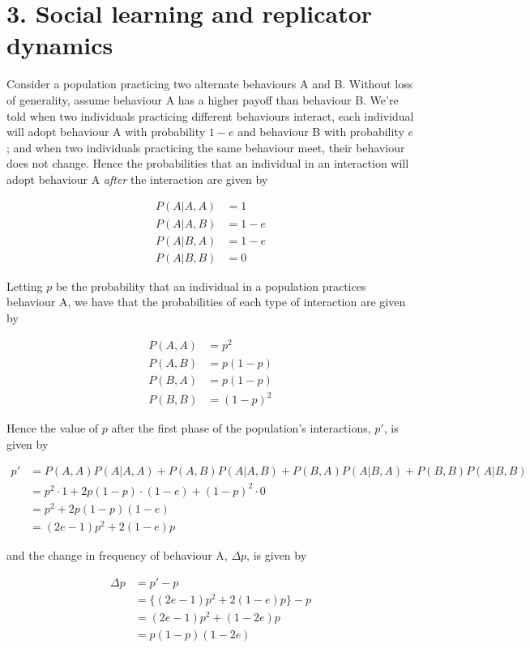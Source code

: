 \documentclass{article}
\begin{document}
\section*{3. Social learning and replicator dynamics}

Consider a population practicing two alternate behaviours A and B.
Without loss of generality, assume behaviour A has a higher payoff than
behaviour B. We're told when two individuals practicing different
behaviours interact, each individual will adopt behaviour A with
probability $1 - e$ and behaviour B with probability $e$; and when two
individuals practicing the same behaviour meet, their behaviour does not
change. Hence the probabilities that an individual in an interaction
will adopt behaviour A \textit{after} the interaction are given by

\begin{align*}
    P(A|A,A) &= 1 \\
    P(A|A,B) &= 1 - e \\
    P(A|B,A) &= 1 - e \\
    P(A|B,B) &= 0
\end{align*}

Letting $p$ be the probability that an individual in a population
practices behaviour A, we have that the probabilities of each type of
interaction are given by

\begin{align*}
    P(A,A) &= p^2 \\
    P(A,B) &= p(1 - p) \\
    P(B,A) &= p(1 - p) \\
    P(B,B) &= (1 - p)^2
\end{align*}

Hence the value of $p$ after the first phase of the population's
interactions, $p'$, is given by

\begin{align*}
    p' &= P(A,A)P(A|A,A) + P(A,B)P(A|A,B) + P(B,A)P(A|B,A) + P(B,B)P(A|B,B) \\
       &= p^2 \cdot 1 + 2p(1 - p) \cdot (1 - e) + (1 - p)^2 \cdot 0 \\
       &= p^2 + 2p(1 - p)(1 - e) \\
       &= (2e - 1)p^2 + 2(1 - e)p
\end{align*}

and the change in frequency of behaviour A, $\Delta p$, is given by

\begin{align*}
    \Delta p &= p' - p \\
             &= \{(2e - 1)p^2 + 2(1 - e)p\} - p \\
             &= (2e - 1)p^2 + (1 - 2e)p \\
             &= p(1 - p)(1 - 2e)
\end{align*}
\end{document}
